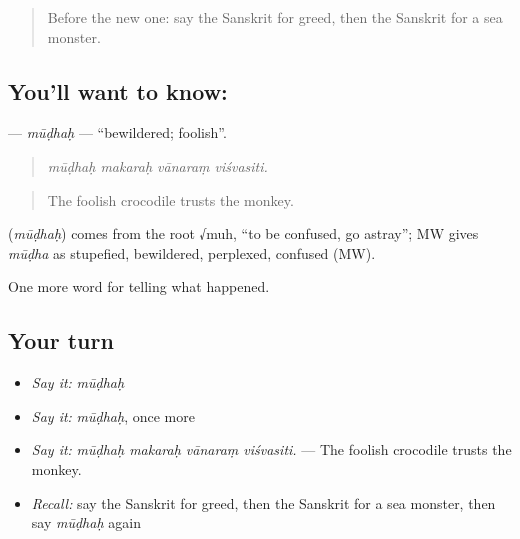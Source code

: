 \label{lesson:SA-C336-mudhah}



\begin{quote}
Before the new one: say the Sanskrit for greed, then the Sanskrit for a sea monster.
\end{quote}

\subsection*{You'll want to know: }
\textbf{} — \emph{mūḍhaḥ} — \textquotedblleft{}bewildered; foolish\textquotedblright{}.

\begin{quote}
   
\end{quote}

\begin{quote}
\emph{mūḍhaḥ makaraḥ vānaraṃ viśvasiti.}
\end{quote}

\begin{quote}
The foolish crocodile trusts the monkey.
\end{quote}

\begin{cousinweb}
\textbf{} (\emph{mūḍhaḥ}) comes from the root √muh, \textquotedblleft{}to be confused, go astray\textquotedblright{}; MW gives \emph{mūḍha} as stupefied, bewildered, perplexed, confused (MW).
\end{cousinweb}

\begin{grammarlens}[title={What you've built}]
One more word for telling what happened.
\end{grammarlens}

\subsection*{Your turn}
\begin{itemize}
\raggedright
  \item \emph{Say it:} \emph{mūḍhaḥ}
  \item \emph{Say it:} \emph{mūḍhaḥ}, once more
  \item \emph{Say it:} \emph{mūḍhaḥ makaraḥ vānaraṃ viśvasiti.} — The foolish crocodile trusts the monkey.
  \item \emph{Recall:} say the Sanskrit for greed, then the Sanskrit for a sea monster, then say \emph{mūḍhaḥ} again
\end{itemize}

